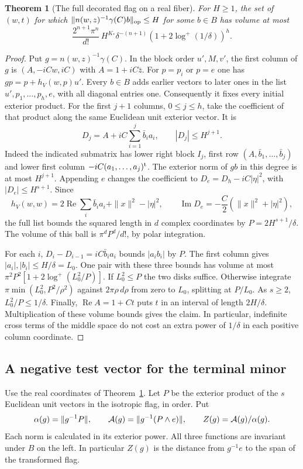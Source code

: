 \documentclass[a4paper,11pt]{article}
\newtheorem{theorem}[proposition]{Theorem}
\theoremstyle{definition}
\theoremstyle{remark}
\numberwithin{equation}{section}
\begin{document}
\begin{theorem}[The full decorated flag on a real fiber]\leavevmode
\label{thm:minor284}
For \(H\ge1\), the set of \((w,t)\) for which
\(\|n(w,z)^{-1}\gamma(C)b\|_{\rm op}\le H\) for some \(b\in B\)
has volume at most
\[
  \frac{2^{n+1}\pi^n}{d!}\,H^{K_*}\delta^{-(n+1)}
              (1+2\log^+(1/\delta))^h .
\]
\end{theorem}
\begin{proof}
Put \(g=n(w,z)^{-1}\gamma(C)\).
In the block order \(u',M,v'\), the first column of \(g\)
is \((A,-iCw,iC)\) with \(A=1+iC\bar z\).
For \(p=p_i\) or \(p=e\) one has
\(gp=p+h_V(w,p)u'\).
Every \(b\in B\) adds earlier vectors to later ones in
the list \(u',p_1,\ldots,p_h,e\), with all diagonal entries
one. Consequently it fixes every initial exterior product.
For the first \(j+1\) columns, \(0\le j\le h\), take the
coefficient of that product along the same Euclidean unit
exterior vector. It is
\[
 D_j=A+iC\sum_{i=1}^j\bar b_i a_i,\qquad |D_j|\le H^{j+1}.
\]
Indeed the indicated submatrix has lower right block \(I_j\),
first row \((A,\bar b_1,\ldots,\bar b_j)\) and lower first
column \(-iC(a_1,\ldots,a_j)^{\rm t}\). The exterior norm
of \(gb\) in this degree is at most \(H^{j+1}\).
Appending \(e\) changes the coefficient to
\(D_e=D_h-iC|\eta|^2\), with \(|D_e|\le H^{s+1}\).
Since
\[
 h_V(w,w)=2\operatorname{Re}\sum_i\bar b_i a_i
                      +\|x\|^2-|\eta|^2,
 \qquad
 \operatorname{Im}D_e=-\frac{C}{2}(\|x\|^2+|\eta|^2),
\]
the full list bounds the squared length in \(d\) complex
coordinates by \(P=2H^{s+1}/\delta\). The volume of this ball
is \(\pi^d P^d/d!\), by polar integration.

For each \(i\), \(D_i-D_{i-1}=iC\bar b_i a_i\) bounds
\(|a_i b_i|\) by \(P\). The first column gives
\(|a_i|,|b_i|\le H/\delta=L_0\). One pair with these three
bounds has volume at most
\(\pi^2P^2[1+2\log^+(L_0^2/P)]\).
If \(L_0^2\le P\) the two disks suffice. Otherwise integrate
\(\pi\min(L_0^2,P^2/\rho^2)\) against \(2\pi\rho\,d\rho\)
from zero to \(L_0\), splitting at \(P/L_0\).
As \(s\ge2\), \(L_0^2/P\le1/\delta\).
Finally, \(\operatorname{Re} A=1+Ct\) puts \(t\) in an
interval of length \(2H/\delta\). Multiplication of these
volume bounds gives the claim. In particular, indefinite
cross terms of the middle space do not cost an extra power
of \(1/\delta\) in each positive column coordinate.
\end{proof}

\subsection{A negative test vector for the terminal minor}\label{nav:VIII-51}
Use the real coordinates of Theorem~\ref{thm:minor284}.
Let \(P\) be the exterior product of the \(s\) Euclidean
unit vectors in the isotropic flag, in order. Put
\[
 \alpha(g)=\|g^{-1}P\|,\qquad
 {\cal A}(g)=\|g^{-1}(P\wedge e)\|,\qquad
 Z(g)={\cal A}(g)/\alpha(g).
\]
Each norm is calculated in its exterior power. All three
functions are invariant under \(B\) on the left. In particular
\(Z(g)\) is the distance from \(g^{-1}e\) to the span of
the transformed flag.
\end{document}
